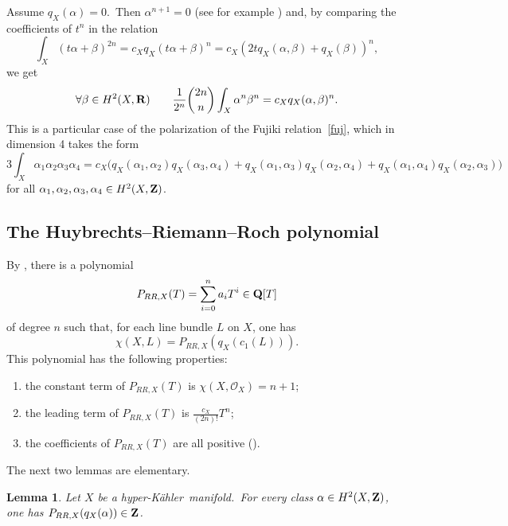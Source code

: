 \documentclass[12pt]{amsart}
\def\cO{\mathscr{O}}
\def\Z{{\bf Z}}
\def\R{{\bf R}}
\def\Q{{\bf Q}}
\def\hk{hyper-K\"ahler}
\newtheorem{lemm}{Lemma}[section]
\theoremstyle{remark}
\begin{document}
Assume $q_X(\alpha)=0$.\
Then $\alpha^{n+1}=0$ (see for example \cite[Proposition~24.1]{huy}) and, by comparing the coefficients of $t^n$ in the relation
\[
\int_X (t\alpha+ \beta)^{2n}=c_Xq_X(t\alpha+ \beta)^n=c_X(2tq_X( \alpha, \beta)+q_X( \beta))^n,
\]
we get
\begin{equation}\label{pol}
\forall \beta\in H^2(X,\R)\qquad \frac{1}{2^n}\binom{2n}{n}\int_X \alpha^{n}\beta^{n}= c_Xq_X( \alpha, \beta)^n.
\end{equation}
This is a particular case of the polarization of the Fujiki relation~\eqref{fuj}, which in dimension 4 takes the form
 \begin{equation}\label{eq:Fujiki3}
 3\!\int_X \alpha_1\alpha_2\alpha_3\alpha_4 =c_X\bigl( q_X(\alpha_1,\alpha_2)q_X(\alpha_3,\alpha_4) + q_X(\alpha_1,\alpha_3)q_X(\alpha_2,\alpha_4) + q_X(\alpha_1,\alpha_4)q_X(\alpha_2,\alpha_3)\bigr)
\end{equation}
for all $\alpha_1, \alpha_2, \alpha_3,\alpha_4\in H^2(X,\Z)$.\

\subsection{The  Huybrechts--Riemann--Roch polynomial}\label{subsec:RRpolynomial}

By \cite[Corollary~23.18]{huy}, there is a polynomial
\begin{equation*}
P_{RR,X}(T)=\sum_{i=0}^n  a_i T^i\in\Q[T]
\end{equation*}
of degree $n$  such that, for each line bundle $L$ on $X$, one has
\begin{equation}\label{rr}
\chi(X,L)=P_{RR,X}(q_X(c_1(L))).
\end{equation}
This polynomial has the following properties:
\begin{enumerate}[{\rm (a)}]
\item\label{ita} the  constant   term of $P_{RR,X}(T)$ is $\chi(X,\cO_X)=n+1$;
\item\label{itb} the leading term of $P_{RR,X}(T)$ is $\frac{c_X}{(2n)!} T^n $;
\item the coefficients of $P_{RR,X}(T)$ are all positive (\cite[Theorem~1.1]{jia}).
\end{enumerate}

The next two lemmas are elementary.

\begin{lemm}\label{lem11}
Let $X$ be a \hk\ manifold.\ For every class $\alpha\in H^2(X,\Z)$, one has $P_{RR,X}(q_X(\alpha))\in\Z$.
\end{lemm}
\end{document}
